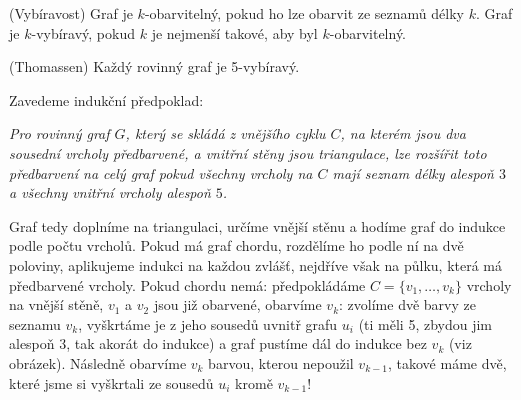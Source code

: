 \df (Vybíravost) Graf je $k$-obarvitelný, pokud ho lze obarvit ze seznamů délky 
$k$. Graf je $k$-vybíravý, pokud $k$ je nejmenší takové, aby byl 
$k$-obarvitelný.

\vt (Thomassen) Každý rovinný graf je 5-vybíravý.

\dk Zavedeme indukční předpoklad: 

{\it Pro rovinný graf $G$, který se skládá z vnějšího cyklu $C$, na kterém jsou 
	dva sousední vrcholy předbarvené, a vnitřní stěny jsou triangulace, lze 
	rozšířit toto předbarvení na celý graf pokud všechny vrcholy na $C$ mají 
seznam délky alespoň $3$ a všechny vnitřní vrcholy alespoň $5$.}

Graf tedy doplníme na triangulaci, určíme vnější stěnu a hodíme graf do indukce 
podle počtu vrcholů. Pokud má graf chordu, rozdělíme ho podle ní na dvě 
poloviny, aplikujeme indukci na každou zvlášť, nejdříve však na půlku, která má 
předbarvené vrcholy. Pokud chordu nemá: předpokládáme $C=\{v_1, \dots, v_k\}$ 
vrcholy na vnější stěně, $v_1$ a $v_2$ jsou již obarvené, obarvíme $v_k$: 
zvolíme dvě barvy ze seznamu $v_k$, vyškrtáme
je z jeho sousedů uvnitř grafu $u_i$ (ti měli 5, zbydou jim alespoň 3, tak 
akorát do indukce) a graf pustíme dál do indukce bez $v_k$ (viz obrázek).  
Následně obarvíme $v_k$ barvou, kterou nepoužil $v_{k-1}$, takové máme dvě, 
které jsme si vyškrtali ze sousedů $u_i$ kromě $v_{k-1}$!

